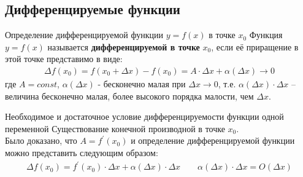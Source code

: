 \subsection{Дифференцируемые функции} \label{sec:2.2}

\begin{tbox}{Определение дифференцируемой функции $y = f(x)$ в точке $x_0$}
	Функция $y = f(x)$ называется \textbf{дифференцируемой в точке} \( x_0 \), если её приращение в этой точке представимо в виде:
	\begin{align} \label{eq:2.2.1}
		\Delta f(x_0) = f(x_0 + \Delta x) - f(x_0) = A \cdot \Delta x + \alpha(\Delta x) \to 0
	\end{align}
	где $A = const$, $\alpha(\Delta x)$ - бесконечно малая при \(\Delta x \to 0\), т.е. $\alpha(\Delta x) \cdot \Delta x$ -- величина бесконечно малая, более высокого порядка малости, чем $\Delta x$.
\end{tbox}

\begin{tbox}{Необходимое и достаточное условие дифференцируемости функции одной переменной}
	Существование конечной производной в точке $x_0$.\\

	Было доказано, что $A = f^{\prime}(x_0)$ и определение дифференцируемой функции можно представить следующим образом:
	\begin{align} \label{eq:2.2.2}
		\Delta f(x_0) = f^{\prime}(x_0) \cdot \Delta x + \alpha(\Delta x) \cdot \Delta x \qquad \alpha (\Delta x) \cdot \Delta x = O(\Delta x)
	\end{align}
\end{tbox}

